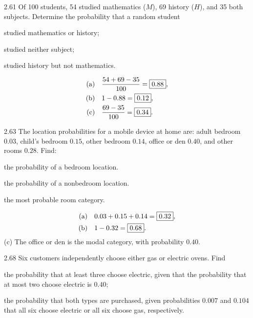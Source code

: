 \documentclass[11pt,oneside]{article}
\begin{document}
\begin{exercise}{2.61}
Of 100 students, 54 studied mathematics ($M$), 69 history ($H$), and 35 both subjects. Determine the probability that a random student
\par
\begin{exercisesubparts}
\item studied mathematics or history;
\item studied neither subject;
\item studied history but not mathematics.
\end{exercisesubparts}
\end{exercise}

\begin{solution}
\begin{align*}
\textup{(a)}\quad&\frac{54+69-35}{100}=\boxed{0.88},\\
\textup{(b)}\quad&1-0.88=\boxed{0.12},\\
\textup{(c)}\quad&\frac{69-35}{100}=\boxed{0.34}.
\end{align*}
\end{solution}

\begin{exercise}{2.63}
The location probabilities for a mobile device at home are: adult bedroom $0.03$, child's bedroom $0.15$, other bedroom $0.14$, office or den $0.40$, and other rooms $0.28$. Find:
\begin{exercisesubparts}
\item the probability of a bedroom location.
\item the probability of a nonbedroom location.
\item the most probable room category.
\end{exercisesubparts}
\end{exercise}

\begin{solution}
\begin{align*}
\textup{(a)}\quad&0.03+0.15+0.14=\boxed{0.32},\\
\textup{(b)}\quad&1-0.32=\boxed{0.68}.
\end{align*}
\noindent\textup{(c)} The office or den is the modal category, with probability $\boxed{0.40}$.
\end{solution}

\begin{exercise}{2.68}
Six customers independently choose either gas or electric ovens. Find
\par
\begin{exercisesubparts}
\item the probability that at least three choose electric, given that the probability that at most two choose electric is $0.40$;
\item the probability that both types are purchased, given probabilities $0.007$ and $0.104$ that all six choose electric or all six choose gas, respectively.
\end{exercisesubparts}
\end{exercise}
\end{document}
